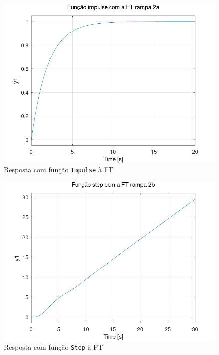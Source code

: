 \documentclass[a4paper,12pt]{article}
\begin{document}
    \begin{figure}[h]
        \centering
        \includegraphics[scale=0.4]{../fig/fig2aImpulse.png}
        \caption{Resposta com função \texttt{Impulse} à FT}
        \label{fig2aImpulse}
    \end{figure}
    \begin{figure}[h]
        \centering
        \includegraphics[scale=0.4]{../fig/fig2bStep.png}
        \caption{Resposta com função \texttt{Step} à FT}
        \label{fig2bStep}
    \end{figure}
\end{document}
